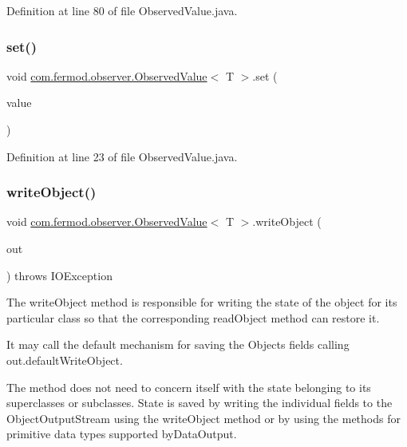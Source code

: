 Definition at line 80 of file Observed\+Value.\+java.

\mbox{\label{a00034_a40797fd2e2d1fb512ce6be7a35e67af2}} 
\subsubsection{\texorpdfstring{set()}{set()}}
{\footnotesize\ttfamily void \mbox{\hyperlink{a00034}{com.\+fermod.\+observer.\+Observed\+Value}}$<$ T $>$.set (\begin{DoxyParamCaption}\item[{T}]{value }\end{DoxyParamCaption})}



Definition at line 23 of file Observed\+Value.\+java.

\mbox{\label{a00034_ae1d53d3762867c30fb44fdfdfa320d8c}} 
\subsubsection{\texorpdfstring{writeObject()}{writeObject()}}
{\footnotesize\ttfamily void \mbox{\hyperlink{a00034}{com.\+fermod.\+observer.\+Observed\+Value}}$<$ T $>$.write\+Object (\begin{DoxyParamCaption}\item[{Object\+Output\+Stream}]{out }\end{DoxyParamCaption}) throws I\+O\+Exception\hspace{0.3cm}{\ttfamily [private]}}



The {\ttfamily write\+Object} method is responsible for writing the state of the object for its particular class so that the corresponding {\ttfamily read\+Object} method can restore it. 

It may call the default mechanism for saving the Object\textquotesingle{}s fields calling {\ttfamily out.\+default\+Write\+Object}. 

The method does not need to concern itself with the state belonging to its superclasses or subclasses. State is saved by writing the individual fields to the {\ttfamily Object\+Output\+Stream} using the {\ttfamily write\+Object} method or by using the methods for primitive data types supported by{\ttfamily  Data\+Output}.


